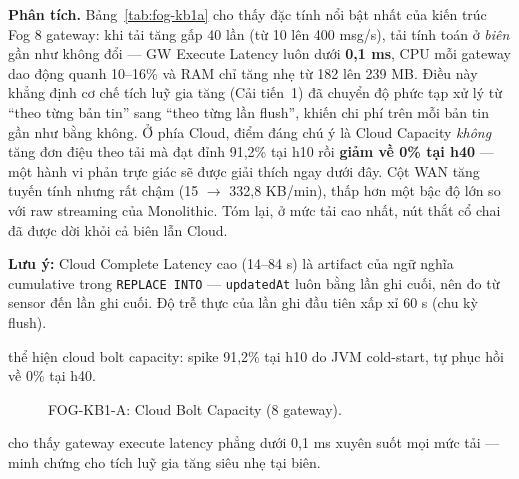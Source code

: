 \documentclass[13pt,a4paper]{report}
\newcommand{\code}[1]{\texttt{\small #1}}
\begin{document}
\textbf{Phân tích.} Bảng~\ref{tab:fog-kb1a} cho thấy đặc tính nổi bật nhất của
kiến trúc Fog 8 gateway: khi tải tăng gấp 40 lần (từ 10 lên 400 msg/s), tải tính
toán ở \textit{biên} gần như không đổi --- GW Execute Latency luôn dưới
\textbf{0,1 ms}, CPU mỗi gateway dao động quanh 10--16\% và RAM chỉ tăng nhẹ từ
182 lên 239 MB. Điều này khẳng định cơ chế tích luỹ gia tăng (Cải tiến~1) đã
chuyển độ phức tạp xử lý từ ``theo từng bản tin'' sang ``theo từng lần flush'',
khiến chi phí trên mỗi bản tin gần như bằng không. Ở phía Cloud, điểm đáng chú ý
là Cloud Capacity \textit{không} tăng đơn điệu theo tải mà đạt đỉnh 91,2\% tại h10
rồi \textbf{giảm về 0\% tại h40} --- một hành vi phản trực giác sẽ được giải thích
ngay dưới đây. Cột WAN tăng tuyến tính nhưng rất chậm (15 $\to$ 332,8 KB/min),
thấp hơn một bậc độ lớn so với raw streaming của Monolithic. Tóm lại, ở mức tải
cao nhất, nút thắt cổ chai đã được dời khỏi cả biên lẫn Cloud.

\textbf{Lưu ý:} Cloud Complete Latency cao (14--84 s) là artifact của ngữ nghĩa
cumulative trong \code{REPLACE INTO} --- \code{updatedAt} luôn bằng lần ghi cuối,
nên đo từ sensor đến lần ghi cuối. Độ trễ thực của lần ghi đầu tiên xấp xỉ 60 s
(chu kỳ flush).

 thể hiện cloud bolt capacity: spike 91,2\% tại h10 do JVM
cold-start, tự phục hồi về 0\% tại h40.

\begin{figure}[H]
\centering
{}
\caption{FOG-KB1-A: Cloud Bolt Capacity (8 gateway).}
\label{fig:fog-kb1a-cap}
\end{figure}

 cho thấy gateway execute latency phẳng dưới 0,1 ms xuyên
suốt mọi mức tải --- minh chứng cho tích luỹ gia tăng siêu nhẹ tại biên.
\end{document}
